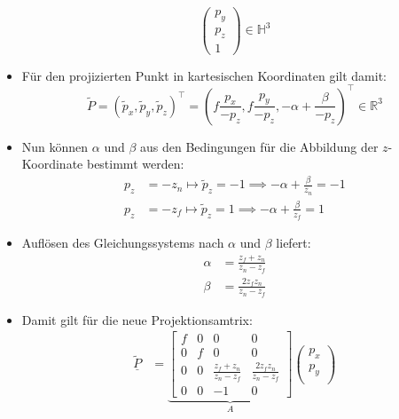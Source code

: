 \documentclass{scrartcl}
\begin{document}
\begin{itemize}
\begin{equation}
\begin{pmatrix}
		p_y \\
		p_z \\
		1
		\end{pmatrix} \in \mathbb{H}^3
	\end{equation}
	\item Für den projizierten Punkt in kartesischen Koordinaten gilt damit: \\
	\begin{equation}
		\widetilde{P} = (\widetilde{p}_x, \widetilde{p}_y, \widetilde{p}_z)^\top = (f \frac{p_x}{-p_z}, f \frac{p_y}{-p_z}, - \alpha + \frac{\beta}{-p_z})^\top \in \mathbb{R}^3
		\end{equation}
		\item Nun können $\alpha$ und $\beta$ aus den Bedingungen für die Abbildung der $z$-Koordinate bestimmt werden: \\
		\begin{equation}
			\begin{split}
				p_z &= -z_n \mapsto \widetilde{p}_z = -1 \implies -\alpha + \frac{\beta}{z_n} = -1 \\
				p_z &= -z_f \mapsto \widetilde{p}_z = 1 \implies -\alpha + \frac{\beta}{z_f} = 1			\end{split}
	\end{equation}
	\item Auflösen des Gleichungssystems nach $\alpha$ und $\beta$ liefert: \\
	\begin{equation}
		\begin{split}
			\alpha &= \frac{z_f + z_n}{z_n - z_f} \\
			\beta &= \frac{2 z_f z_n}{z_n - z_f}
		\end{split}
	\end{equation}
	\item Damit gilt für die neue Projektionsamtrix: \\
	\begin{equation}
		\begin{split}
			\underline{\widetilde{P}} &= \underbrace{\begin{bmatrix}
			f & 0 & 0 & 0 \\
			0 & f & 0 & 0 \\
			0 & 0 & \frac{z_f + z_n}{z_n - z_f} & \frac{2 z_f z_n}{z_n - z_f} \\
			0 & 0 & -1 & 0
			\end{bmatrix}}_A \begin{pmatrix}
			p_x \\
			p_y \\

\end{pmatrix}
\end{split}
\end{equation}
\end{itemize}
\end{document}
